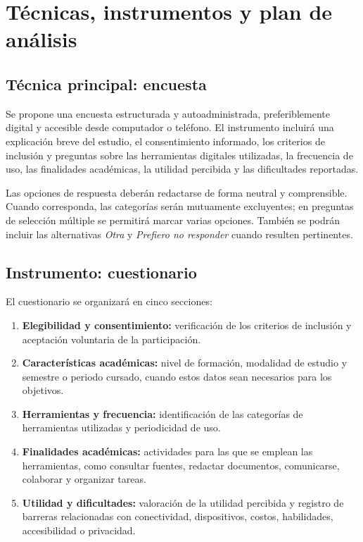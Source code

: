 
\section{Técnicas, instrumentos y plan de análisis}

\subsection{Técnica principal: encuesta}

Se propone una encuesta estructurada y autoadministrada, preferiblemente digital y accesible desde computador o teléfono. El instrumento incluirá una explicación breve del estudio, el consentimiento informado, los criterios de inclusión y preguntas sobre las herramientas digitales utilizadas, la frecuencia de uso, las finalidades académicas, la utilidad percibida y las dificultades reportadas.

Las opciones de respuesta deberán redactarse de forma neutral y comprensible. Cuando corresponda, las categorías serán mutuamente excluyentes; en preguntas de selección múltiple se permitirá marcar varias opciones. También se podrán incluir las alternativas \textit{Otra} y \textit{Prefiero no responder} cuando resulten pertinentes.

\subsection{Instrumento: cuestionario}

El cuestionario se organizará en cinco secciones:

\begin{enumerate}
    \item \textbf{Elegibilidad y consentimiento:} verificación de los criterios de inclusión y aceptación voluntaria de la participación.
    
    \item \textbf{Características académicas:} nivel de formación, modalidad de estudio y semestre o periodo cursado, cuando estos datos sean necesarios para los objetivos.
    
    \item \textbf{Herramientas y frecuencia:} identificación de las categorías de herramientas utilizadas y periodicidad de uso.
    
    \item \textbf{Finalidades académicas:} actividades para las que se emplean las herramientas, como consultar fuentes, redactar documentos, comunicarse, colaborar y organizar tareas.
    
    \item \textbf{Utilidad y dificultades:} valoración de la utilidad percibida y registro de barreras relacionadas con conectividad, dispositivos, costos, habilidades, accesibilidad o privacidad.
\end{enumerate}

